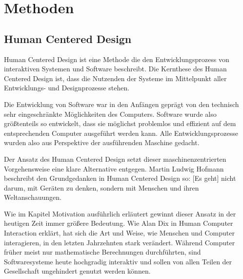 
\section{Methoden}

\subsection{Human Centered Design}
Human Centered Design ist eine Methode die den Entwicklungsprozess von
interaktiven Systemen und Software beschreibt. Die Kernthese des Human Centered
Design ist, dass die Nutzenden der Systeme im Mittelpunkt aller Entwicklungs-
und Designprozesse stehen.

Die Entwicklung von Software war in den Anfängen geprägt von den technisch sehr
eingeschränkte Möglichkeiten des Computers. Software wurde also größtenteils so
entwickelt, dass sie möglichst problemlos und effizient auf dem entsprechenden
Computer ausgeführt werden kann. Alle Entwicklungsprozesse wurden also aus
Perspektive der ausführenden Maschine gedacht.

Der Ansatz des Human Centered Design setzt dieser maschinenzentrierten
Vorgehensweise eine klare Alternative entgegen. Martin Ludwig Hofmann
beschreibt den Grundgedanken in \glqq{} Human Centered Design\grqq{} so:
\glqq{} [Es geht] nicht darum, mit Geräten zu denken, sondern mit Menschen und
ihren Weltanschauungen\grqq{}. \cite{hcd}

Wie im Kapitel Motivation ausführlich erläutert gewinnt dieser Ansatz in der
heutigen Zeit immer größere Bedeutung. Wie Alan Dix in \glqq{} Human Computer
Interaction\grqq{} erklärt, hat sich die Art und Weise, wie Menschen und
Computer interagieren, in den letzten Jahrzehnten stark verändert. Während
Computer früher meist nur mathematische Berechnungen durchführten, sind
Softwaresysteme heute hochgradig interaktiv und sollen von allen Teilen der
Gesellschaft ungehindert genutzt werden können. \cite{hci}

